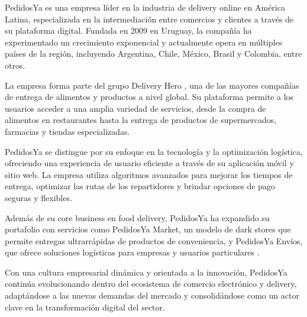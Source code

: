 PedidosYa es una empresa líder en la industria de delivery online en América Latina, especializada en la intermediación entre comercios y clientes a través de su plataforma digital. Fundada en 2009 en Uruguay, la compañía ha experimentado un crecimiento exponencial y actualmente opera en múltiples países de la región, incluyendo Argentina, Chile, México, Brasil y Colombia, entre otros.

La empresa forma parte del grupo Delivery Hero \parencite{deliveryhero_pedidosya2025}, una de las mayores compañías de entrega de alimentos y productos a nivel global. Su plataforma permite a los usuarios acceder a una amplia variedad de servicios, desde la compra de alimentos en restaurantes hasta la entrega de productos de supermercados, farmacias y tiendas especializadas.

PedidosYa se distingue por su enfoque en la tecnología y la optimización logística, ofreciendo una experiencia de usuario eficiente a través de su aplicación móvil y sitio web. La empresa utiliza algoritmos avanzados para mejorar los tiempos de entrega, optimizar las rutas de los repartidores y brindar opciones de pago seguras y flexibles.

Además de su core business en food delivery, PedidosYa ha expandido su portafolio con servicios como PedidosYa Market, un modelo de dark stores que permite entregas ultrarrápidas de productos de conveniencia, y PedidosYa Envíos, que ofrece soluciones logísticas para empresas y usuarios particulares \parencite{pedidosya_envios}.

Con una cultura empresarial dinámica y orientada a la innovación, PedidosYa continúa evolucionando dentro del ecosistema de comercio electrónico y delivery, adaptándose a las nuevas demandas del mercado y consolidándose como un actor clave en la transformación digital del sector.
